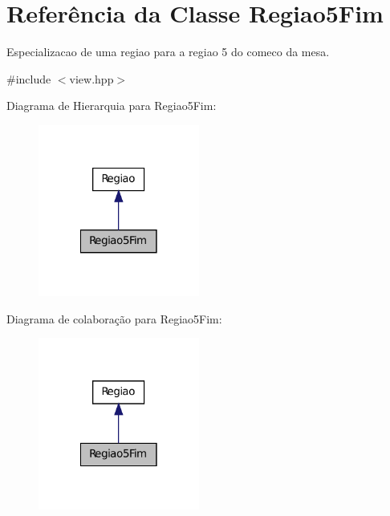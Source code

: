 \hypertarget{classRegiao5Fim}{
\section{Referência da Classe Regiao5Fim}
\label{classRegiao5Fim}
}


Especializacao de uma regiao para a regiao 5 do comeco da mesa.  




{\ttfamily \#include $<$view.hpp$>$}



Diagrama de Hierarquia para Regiao5Fim:\nopagebreak
\begin{figure}[H]
\begin{center}
\leavevmode
\includegraphics[width=150pt]{classRegiao5Fim__inherit__graph}
\end{center}
\end{figure}


Diagrama de colaboração para Regiao5Fim:\nopagebreak
\begin{figure}[H]
\begin{center}
\leavevmode
\includegraphics[width=150pt]{classRegiao5Fim__coll__graph}
\end{center}
\end{figure}

